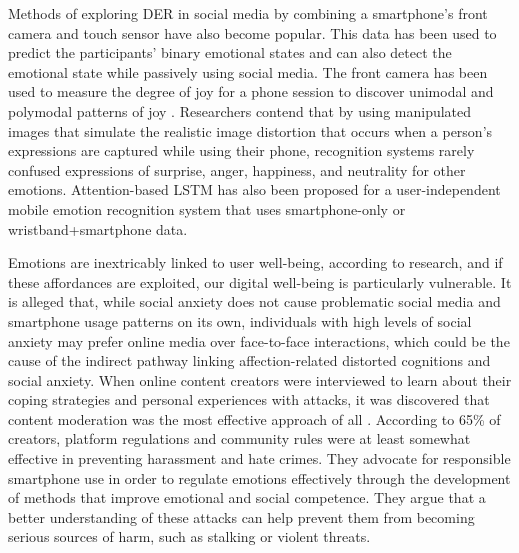 \documentclass[lettersize,journal]{IEEEtran}
\begin{document}
Methods of exploring DER in social media by combining a smartphone's front camera and touch sensor have also become popular. This data has been used to predict the participants' binary emotional states and can also detect the emotional state while passively using social media. The front camera has been used to measure the degree of joy for a phone session to discover unimodal and polymodal patterns of joy \cite{tag2022emotion}. Researchers contend that by using manipulated images that simulate the realistic image distortion that occurs when a person's expressions are captured while using their phone, recognition systems rarely confused expressions of surprise, anger, happiness, and neutrality for other emotions. Attention-based LSTM has also been proposed for a user-independent mobile emotion recognition system that uses smartphone-only or wristband+smartphone data.

Emotions are inextricably linked to user well-being, according to research, and if these affordances are exploited, our digital well-being is particularly vulnerable. It is alleged that, while social anxiety does not cause problematic social media and smartphone usage patterns on its own, individuals with high levels of social anxiety may prefer online media over face-to-face interactions, which could be the cause of the indirect pathway linking affection-related distorted cognitions and social anxiety.  When online content creators were interviewed to learn about their coping strategies and personal experiences with attacks, it was discovered that content moderation was the most effective approach of all \cite{thomas2022s}. According to 65\% of creators, platform regulations and community rules were at least somewhat effective in preventing harassment and hate crimes. They advocate for responsible smartphone use in order to regulate emotions effectively through the development of methods that improve emotional and social competence. They argue that a better understanding of these attacks can help prevent them from becoming serious sources of harm, such as stalking or violent threats.
\end{document}
